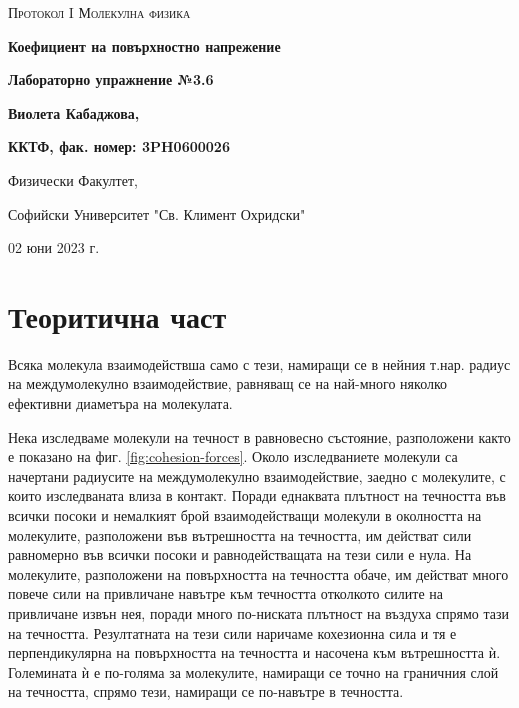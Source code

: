 \documentclass[12pt]{article}
\begin{document}
\begin{titlepage}
	\flushleft
	{\scshape\Large Протокол I \hspace{2cm} Молекулна физика\par}
	\vspace{4cm}
	{\huge\bfseries Коефициент на повърхностно напрежение\par}
	\vspace{1cm}
	{\LARGE\bfseries Лабораторно упражнение №3.6\par}
	\vspace{5cm}
    {\LARGE\bfseries Виолета Кабаджова, \par}
    {\large\bfseries ККТФ, фак. номер: 3PH0600026\par}
	\vspace{1cm}
	
	{\large Физически Факултет, 
	
	Софийски Университет "Св. Климент Охридски"
	
	02 юни 2023 г.\par}
	
\end{titlepage}

\section{Теоритична част}\label{sec:theoretical-part}
Всяка молекула взаимодействша само с тези, намиращи се в нейния т.нар. радиус на междумолекулно взаимодействие, равняващ се на най-много няколко ефективни диаметъра на молекулата.

Нека изследваме молекули на течност в равновесно състояние, разположени както е показано на фиг. \ref{fig:cohesion-forces}. Около изследваниете молекули са начертани радиусите на междумолекулно взаимодействие, заедно с молекулите, с които изследваната влиза в контакт. Поради еднаквата плътност на течността във всички посоки и немалкият брой взаимодействащи молекули в околността на молекулите, разположени във вътрешността на течността, им действат сили равномерно във всички посоки и равнодействащата на тези сили е нула. На молекулите, разположени на повърхността на течността обаче, им действат много повече сили на привличане навътре към течността отколкото силите на привличане извън нея, поради много по-ниската плътност на въздуха спрямо тази на течността. Резултатната на тези сили наричаме кохезионна сила и тя е перпендикулярна на повърхността на течността и насочена към вътрешността ѝ. Големината ѝ е по-голяма за молекулите, намиращи се точно на граничния слой на течността, спрямо тези, намиращи се по-навътре в течността.
\end{document}
